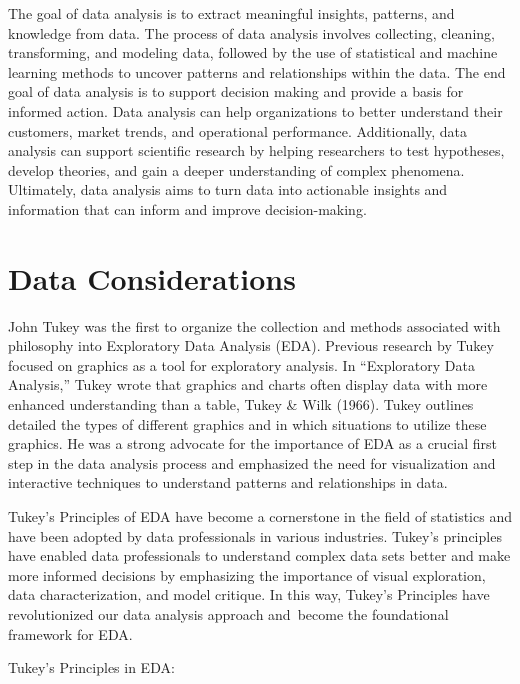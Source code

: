 \documentclass[print]{nuthesis}
\begin{document}
The goal of data analysis is to extract meaningful insights, patterns, and knowledge from data.
The process of data analysis involves collecting, cleaning, transforming, and modeling data, followed by the use of statistical and machine learning methods to uncover patterns and relationships within the data.
The end goal of data analysis is to support decision making and provide a basis for informed action.
Data analysis can help organizations to better understand their customers, market trends, and operational performance.
Additionally, data analysis can support scientific research by helping researchers to test hypotheses, develop theories, and gain a deeper understanding of complex phenomena.
Ultimately, data analysis aims to turn data into actionable insights and information that can inform and improve decision-making.

\hypertarget{data-considerations}{%
\section{Data Considerations}\label{data-considerations}}

John Tukey was the first to organize the collection and methods associated with philosophy into Exploratory Data Analysis (EDA).
Previous research by Tukey focused on graphics as a tool for exploratory analysis.
In ``Exploratory Data Analysis,'' Tukey wrote that graphics and charts often display data with more enhanced understanding than a table, Tukey \& Wilk (1966).
Tukey outlines detailed the types of different graphics and in which situations to utilize these graphics.
He was a strong advocate for the importance of EDA as a crucial first step in the data analysis process and emphasized the need for visualization and interactive techniques to understand patterns and relationships in data.

Tukey's Principles of EDA have become a cornerstone in the field of statistics and have been adopted by data professionals in various industries.
Tukey's principles have enabled data professionals to understand complex data sets better and make more informed decisions by emphasizing the importance of visual exploration, data characterization, and model critique.
In this way, Tukey's Principles have revolutionized our data analysis approach and~become the foundational framework for EDA.

Tukey's Principles in EDA:
\end{document}
